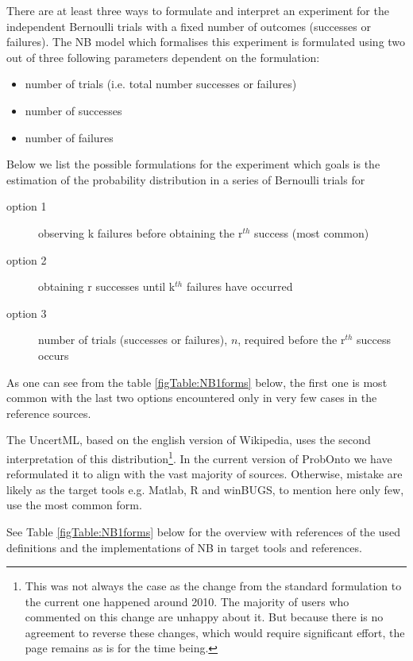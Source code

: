 There are at least three ways to formulate and interpret an experiment for 
the independent Bernoulli trials with a fixed number of outcomes (successes or
failures). The NB model which formalises this experiment is formulated using two 
out of three following parameters dependent on the formulation: 
\begin{itemize}
\item 
number of trials (i.e. total number successes or failures) %
\item
number of successes %
\item
number of failures %
\end{itemize} 
Below we list the possible formulations for the experiment which goals is the 
estimation of the probability distribution in a series of Bernoulli trials for
\begin{description}
\item[option 1]
observing k failures before obtaining the r$^{th}$ success (most common)
\item[option 2]
obtaining r successes until k$^{th}$ failures have occurred
\item[option 3]
number of trials (successes or failures), $n$, required before the r$^{th}$ success occurs 
\end{description}
As one can see from the table \ref{figTable:NB1forms} below, the first one is most 
common with the last two options encountered only in very few cases in the 
reference sources.

The UncertML, based on the english version of Wikipedia, uses the second 
interpretation of this distribution\footnote{This was not always the case as the change from the 
standard formulation to the current one happened around 2010. The majority of users who
commented on this change are unhappy about it. But because there
is no agreement to reverse these changes, which would require significant effort, 
the page remains as is for the time being.}. In the current version of ProbOnto we have 
reformulated it to align with the vast majority of sources. 
Otherwise, mistake are likely as the target tools e.g. Matlab, R and 
winBUGS, to mention here only few, use the most common form.

See Table \ref{figTable:NB1forms} below for the overview with references of the used definitions and 
the implementations of NB in target tools and references.


